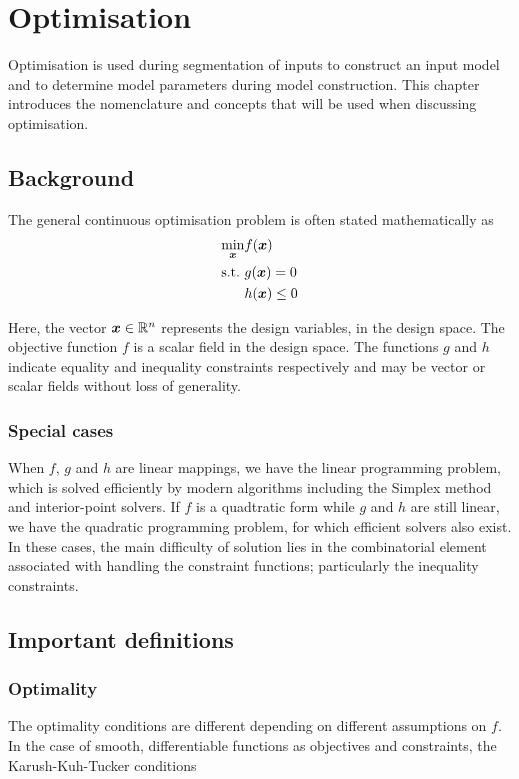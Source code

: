 \chapter{Optimisation}
\begin{overview}
  Optimisation is used during segmentation of inputs to construct an input model and to determine model parameters during model construction.
  This chapter introduces the nomenclature and concepts that will be used when discussing optimisation.
\end{overview}

\section{Background}
The general continuous optimisation problem is often stated mathematically as
\begin{align}
  \label{eq:nonlinear_optmisation}
  \min_{\boldsymbol{x}} &  f(\boldsymbol{x}) \\
   \text{s.t.~} & g(\boldsymbol{x}) = 0 \\
 & h(\boldsymbol{x}) \leq 0
\end{align}

Here, the vector $\boldsymbol{x} \in \mathbb{R}^n$ represents the design variables, in the design space.  
The objective function $f$ is a scalar field in the design space.
The functions $g$ and $h$ indicate equality and inequality constraints respectively and may be vector or scalar fields without loss of generality.

\subsection{Special cases}
When $f$, $g$ and $h$ are linear mappings, we have the linear programming problem, which is solved efficiently by modern algorithms including the Simplex method and interior-point solvers.  
If $f$ is a quadtratic form while $g$ and $h$ are still linear, we have the quadratic programming problem, for which efficient solvers also exist.  
In these cases, the main difficulty of solution lies in the combinatorial element associated with handling the constraint functions; particularly the inequality constraints.


\section{Important definitions}
\subsection{Optimality}
The optimality conditions are different depending on different assumptions on $f$.  
In the case of smooth, differentiable functions as objectives and constraints, the 
Karush-Kuh-Tucker conditions

